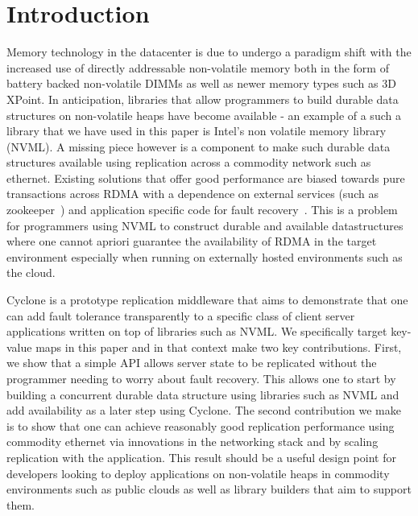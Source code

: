 \documentclass[letterpaper,twocolumn,10pt]{article}
\begin{document}
\section{Introduction}
Memory technology in the datacenter is due to undergo a paradigm shift with the
increased use of directly addressable non-volatile memory both in the form of
battery backed non-volatile DIMMs as well as newer memory types such as 3D
XPoint. In anticipation, libraries that allow programmers to build durable data
structures on non-volatile heaps have become available - an example of a such a
library that we have used in this paper is Intel's non volatile memory library
(NVML). A missing piece however is a component to make such durable data
structures available using replication across a commodity network such as
ethernet. Existing solutions that offer good performance are biased towards pure
transactions across RDMA with a dependence on external services (such as
zookeeper~\cite{zookeeper}) and application specific code for fault recovery~\cite{farm,
  htm}. This is a problem for programmers using NVML to construct durable and
available datastructures where one cannot apriori guarantee the availability of
RDMA in the target environment especially when running on externally hosted
environments such as the cloud.

Cyclone is a prototype replication middleware that aims to demonstrate that one
can add fault tolerance transparently to a specific class of client server
applications written on top of libraries such as NVML. We specifically target
key-value maps in this paper and in that context make two key
contributions. First, we show that a simple API allows server state to be
replicated without the programmer needing to worry about fault recovery. This
allows one to start by building a concurrent durable data structure using
libraries such as NVML and add availability as a later step using Cyclone. The
second contribution we make is to show that one can achieve reasonably good
replication performance using commodity ethernet via innovations in the
networking stack and by scaling replication with the application. This result
should be a useful design point for developers looking to deploy applications on
non-volatile heaps in commodity environments such as public clouds as well as
library builders that aim to support them.
\end{document}
